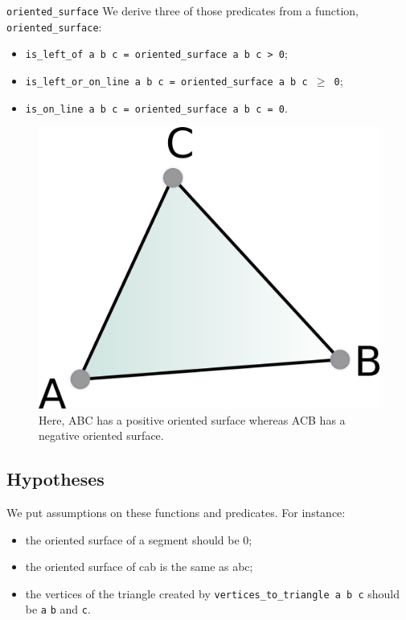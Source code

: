 \documentclass[18pt]{beamer}
\begin{document}
\begin{frame}{\tt oriented\_surface}
We derive three of those predicates from a function, {\tt oriented\_surface}:
{\small   \begin{itemize}
\item<2-> {\tt is\_left\_of a b c = oriented\_surface a b c > 0};
  \item<3-> {\tt is\_left\_or\_on\_line a b c = oriented\_surface a b c $\geq$ 0};
  \item<4> {\tt is\_on\_line a b c = oriented\_surface a b c = 0}.
 \end{itemize} }

  \begin{overprint}
  \begin{figure}
  \centering
  \includegraphics[scale=1]{Surface}
  \caption{\label{surface} Here, ABC has a positive oriented surface whereas ACB has a negative oriented surface.}
\end{figure}
  \end{overprint}

\end{frame}


\subsection{Hypotheses}

\begin{frame}{}
 We put assumptions on these functions and predicates. For instance:
 \begin{itemize}
  \item<1-> the oriented surface of a segment should be 0;
  \item<2-> the oriented surface of cab is the same as abc;
  \item<3-> the vertices of the triangle created by {\tt vertices\_to\_triangle a b c} should be  {\tt a} {\tt b} and {\tt c}.
 \end{itemize}

\end{frame}
\end{document}
